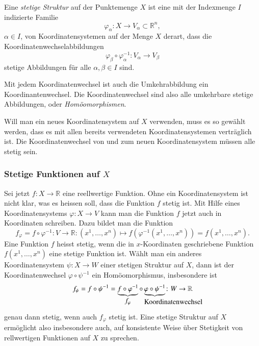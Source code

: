 \begin{definition}
\label{buch:koordinaten:koordinaten:definition:stetigestruktur}
%
%
Eine {\em stetige Struktur} auf der Punktemenge $X$ ist eine mit
der Indexmenge $I$ indizierte Familie
\[
\varphi_\alpha\colon X\to V_\alpha \subset \mathbb{R}^n,
\]
$\alpha\in I$,
von Koordinatensystemen auf der Menge $X$ derart, dass die
Koordinatenwechselabbildungen
\[
\varphi_{\beta}\circ\varphi_\alpha^{-1}
\colon
V_\alpha \to V_\beta
\]
stetige Abbildungen für alle $\alpha,\beta\in I$ sind.
\end{definition}

Mit jedem Koordinatenwechsel ist auch die Umkehrabbildung ein
Koordinantenwechsel.
Die Koordinatenwechsel sind also alle umkehrbare stetige Abbildungen,
oder {\em Homöomorphismen}.
%

Will man ein neues Koordinatensystem auf $X$ verwenden, muss es so
gewählt werden, dass es mit allen bereits verwendeten Koordinatensystemen
verträglich ist.
Die Koordinatenwechsel von und zum neuen Koordinatensystem müssen
alle stetig sein.

%
%
\subsubsection{Stetige Funktionen auf $X$}
Sei jetzt $f\colon X\to\mathbb{R}$ eine reellwertige Funktion.
Ohne ein Koordinatensystem ist nicht klar, was es heissen soll, dass die
Funktion $f$ stetig ist.
Mit Hilfe eines Koordinatensystems $\varphi\colon X\to V$ kann man die
Funktion $f$ jetzt auch in Koordinaten schreiben.
Dazu bildet man die Funktion
\[
f_\varphi
=
f\circ \varphi^{-1}
\colon
V
\to
\mathbb{R}
:
(x^1,\dots,x^n)
\mapsto
f(\varphi^{-1}(x^1,\dots,x^n))
=
f(x^1,\dots,x^n).
\]
Eine Funktion $f$ heisst stetig, wenn die in $x$-Koordinaten geschriebene
Funktion $f(x^1,\dots,x^n)$ eine stetige Funktion ist.
Wählt man ein anderes Koordinatensystem $\psi\colon X\to W$ einer
stetigen Struktur auf $X$, dann ist der Koordinatenwechsel
$\varphi\circ\psi^{-1}$ ein Homöomorphismus, insbesondere ist 
\[
f_\psi
=
f\circ\psi^{-1}
=
\underbrace{f\circ\varphi^{-1}}_{\displaystyle f_\varphi\mathstrut}
\circ
\underbrace{\varphi\circ\psi^{-1}}_{\displaystyle
\hbox to6pt{\rlap{\text{Koordinatenwechsel\strut}}\hfill}}
\colon
W\to \mathbb{R}
\]
genau dann stetig, wenn auch $f_\varphi$ stetig ist.
Eine stetige Struktur auf $X$ ermöglicht also insbesondere auch,
auf konsistente Weise über Stetigkeit von rellwertigen Funktionen
auf $X$ zu sprechen.

